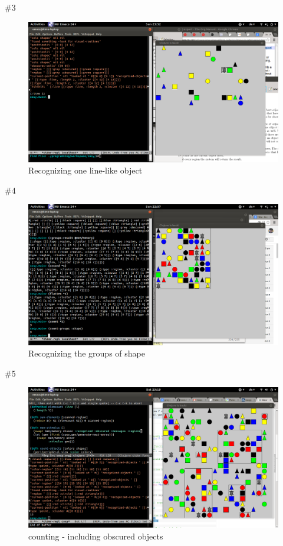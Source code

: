 \documentclass[presentation]{beamer}
\begin{document}
\begin{frame}[label=sec-8]{\#3}
\begin{figure}[hbtp]
     \centering
     \includegraphics[width=\textwidth]{count_obscured}
     \caption{Recognizing one line-like object}
     \label{fig:aufbau}
 \end{figure}
\end{frame}
\begin{frame}[label=sec-9]{\#4}
\begin{figure}[hbtp]
     \centering
     \includegraphics[width= 0.7 \textwidth]{shape_group_example}
     \caption{Recognizing the groups of shape}
     \label{fig:aufbau}
 \end{figure}
\end{frame}

\begin{frame}[label=sec-10]{\#5}
 \begin{figure}[hbtp]
    \centering
    \includegraphics[width= 0.7 \textwidth]{count_red_circles}
    \caption{counting - including obscured objects}
    \label{fig:aufbau}
\end{figure}
\end{frame}
\end{document}
